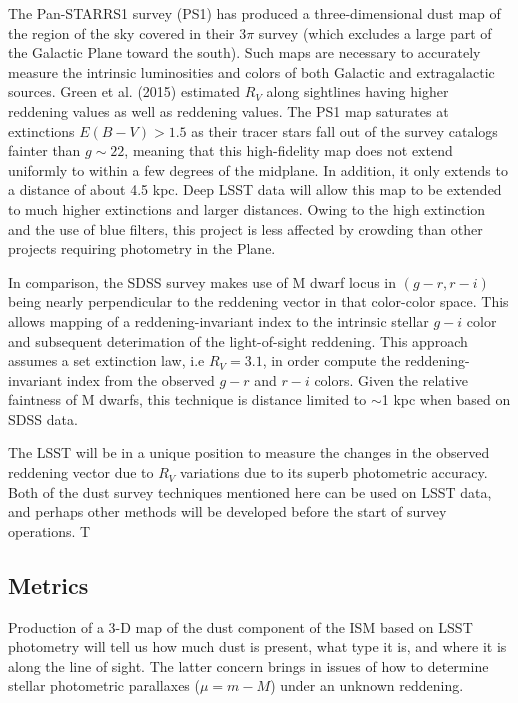 The Pan-STARRS1 survey (PS1) has
produced a three-dimensional dust map of the region of the sky covered
in their 3$\pi$ survey (which excludes a large part of the Galactic
Plane toward the south). Such maps are necessary to accurately measure
the intrinsic luminosities and colors of both Galactic and
extragalactic sources. 
Green et al. (2015) estimated $R_V$ along sightlines having higher 
reddening values as well as reddening values.
The PS1 map saturates at
extinctions $E(B-V) > 1.5$ as their tracer stars fall out of the
survey catalogs fainter than $g\sim 22$, meaning that this
high-fidelity map does not extend uniformly to within a few degrees of
the midplane. In addition, it only extends to a distance of about 4.5
kpc. Deep LSST data will allow this map to be extended to much higher
extinctions and larger distances. Owing to the high extinction and the
use of blue filters, this project is less affected by crowding than
other projects requiring photometry in the Plane. 

In comparison, the SDSS survey makes use of M dwarf locus in
$(g-r,r-i)$ being nearly perpendicular to the reddening vector in that
color-color space. This allows mapping of a reddening-invariant index
to the intrinsic stellar $g-i$ color and subsequent deterimation of
the light-of-sight reddening. This approach assumes a set extinction
law, i.e $R_V = 3.1$, in order compute the reddening-invariant index
from the observed $g-r$ and $r-i$ colors. Given the relative faintness
of M dwarfs, this technique is distance limited to $\sim$1 kpc when
based on SDSS data.

The LSST will be in a unique position to measure the changes in the observed reddening vector
due to $R_V$ variations due to its superb photometric accuracy. 
Both of the dust survey techniques mentioned here can be used on LSST data, and perhaps other 
methods will be developed before the start of survey operations. T


\subsection{Metrics}

\label{sec:\secname:metrics}

Production of a 3-D map of the dust component of the ISM based on LSST photometry will tell us 
how much dust is present, what type it is, and where it is along the line of sight. 
The latter concern brings in issues of how to determine stellar photometric parallaxes ($\mu = m-M$) under
an unknown reddening.


